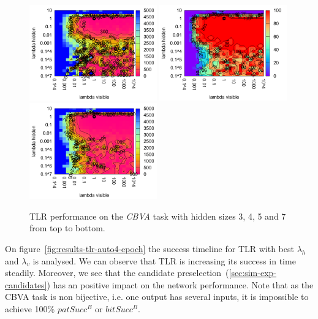 \begin{figure}[H]
  \includegraphics[width=0.49\textwidth]{img/k3/tlr-5-epoch.pdf}  
  \includegraphics[width=0.49\textwidth]{img/k3/tlr-7-success.pdf} 
  \includegraphics[width=0.49\textwidth]{img/k3/tlr-7-epoch.pdf}    
  \caption{TLR performance on the \emph{CBVA} task with hidden sizes 3, 4, 5 and 7 from top to bottom.}
  \label{fig:results-tlr-k3-performance}
\end{figure}

On figure~\ref{fig:results-tlr-auto4-epoch} the success timeline for TLR with best $\lambda_h$ and $\lambda_v$ is analysed. We can observe that TLR is increasing its success in time steadily. Moreover, we see that the candidate preselection~(\ref{sec:sim-exp-candidates}) has an positive impact on the network performance.
Note that as the CBVA task is non bijective, i.e. one output has several inputs, it is impossible to achieve 100\% $patSucc^B$ or $bitSucc^B$. 

